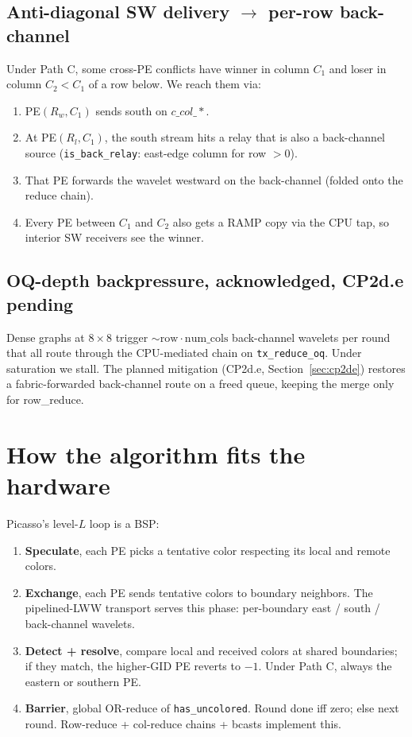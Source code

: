 \documentclass[11pt]{article}
\newcommand{\code}[1]{\texttt{#1}}
\begin{document}
\subsection{Anti-diagonal SW delivery $\to$ per-row back-channel}
Under Path C, some cross-PE conflicts have winner in column $C_1$
and loser in column $C_2 < C_1$ of a row below. We reach them via:

\begin{enumerate}[leftmargin=1.3em,itemsep=0.2em]
  \item PE$(R_w, C_1)$ sends south on $c\_col\_\ast$.
  \item At PE$(R_l, C_1)$, the south stream hits a relay that is
    also a back-channel source (\code{is\_back\_relay}: east-edge
    column for row $> 0$).
  \item That PE forwards the wavelet westward on the back-channel
    (folded onto the reduce chain).
  \item Every PE between $C_1$ and $C_2$ also gets a RAMP copy
    via the CPU tap, so interior SW receivers see the winner.
\end{enumerate}

\subsection{OQ-depth backpressure, acknowledged, CP2d.e pending}
\label{sec:backpressure}
Dense graphs at $8\times 8$ trigger $\sim\!\mathrm{row}\cdot
\mathrm{num\_cols}$ back-channel wavelets per round that all route
through the CPU-mediated chain on \code{tx\_reduce\_oq}. Under
saturation we stall. The planned mitigation (CP2d.e,
Section~\ref{sec:cp2de}) restores a fabric-forwarded back-channel
route on a freed queue, keeping the merge only for row\_reduce.

\section{How the algorithm fits the hardware}

Picasso's level-$L$ loop is a BSP:

\begin{enumerate}[leftmargin=1.3em,itemsep=0.2em]
  \item \textbf{Speculate}, each PE picks a tentative color
    respecting its local and remote colors.
  \item \textbf{Exchange}, each PE sends tentative colors to
    boundary neighbors. The pipelined-LWW transport serves this
    phase: per-boundary east / south / back-channel wavelets.
  \item \textbf{Detect + resolve}, compare local and received
    colors at shared boundaries; if they match, the higher-GID PE
    reverts to $-1$. Under Path C, always the eastern or southern
    PE.
  \item \textbf{Barrier}, global OR-reduce of
    \code{has\_uncolored}. Round done iff zero; else next round.
    Row-reduce + col-reduce chains + bcasts implement this.
\end{enumerate}
\end{document}
